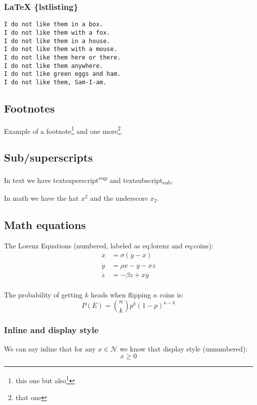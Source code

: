 \subsubsection{{\LaTeX} \{lstlisting\}}
\begin{lstlisting}
I do not like them in a box.
I do not like them with a fox.
I do not like them in a house.
I do not like them with a mouse.
I do not like them here or there.
I do not like them anywhere.
I do not like green eggs and ham.
I do not like them, Sam-I-am.
\end{lstlisting}

\subsection{Footnotes}
Example of a footnote\footnote{this one but also\footnote{a nested note}} and one more\footnote{that one}.

\subsection{Sub/superscripts}
In text we have textsuperscript\textsuperscript{sup} and textsubscript\textsubscript{sub}.

In math we have the hat $x^2$ and the underscore $x_2$.

\subsection{Math equations}
The Lorenz Equations (numbered, labeled as eq:lorenz and eq:coins):
\begin{eqnarray}\label{eq:lorenz}
\dot{x} & =\sigma(y-x)\nonumber  \\ 
\dot{y} & =\rho x-y-xz\nonumber  \\ 
\dot{z} & =-\beta z+xy\nonumber \\
\end{eqnarray}

The probability of getting \(k\) heads when flipping \(n\) coins is:
\begin{equation}\label{eq:coins}
P(E) = {n \choose k} p^k (1-p)^{ n-k}
\end{equation}


\subsubsection{Inline and display style}

We can say inline that for any $x \in \mathcal{N}$ we know that display style (unnumbered):
$$ x \geq 0 $$

